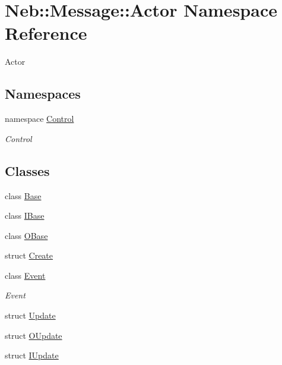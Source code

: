 \hypertarget{namespaceNeb_1_1Message_1_1Actor}{\section{\-Neb\-:\-:\-Message\-:\-:\-Actor \-Namespace \-Reference}
\label{namespaceNeb_1_1Message_1_1Actor}
}


\-Actor  


\subsection*{\-Namespaces}
\begin{DoxyCompactItemize}
\item 
namespace \hyperlink{namespaceNeb_1_1Message_1_1Actor_1_1Control}{\-Control}
\begin{DoxyCompactList}\small\item\em \-Control \end{DoxyCompactList}\end{DoxyCompactItemize}
\subsection*{\-Classes}
\begin{DoxyCompactItemize}
\item 
class \hyperlink{classNeb_1_1Message_1_1Actor_1_1Base}{\-Base}
\item 
class \hyperlink{classNeb_1_1Message_1_1Actor_1_1IBase}{\-I\-Base}
\item 
class \hyperlink{classNeb_1_1Message_1_1Actor_1_1OBase}{\-O\-Base}
\item 
struct \hyperlink{structNeb_1_1Message_1_1Actor_1_1Create}{\-Create}
\item 
class \hyperlink{classNeb_1_1Message_1_1Actor_1_1Event}{\-Event}
\begin{DoxyCompactList}\small\item\em \-Event \end{DoxyCompactList}\item 
struct \hyperlink{structNeb_1_1Message_1_1Actor_1_1Update}{\-Update}
\item 
struct \hyperlink{structNeb_1_1Message_1_1Actor_1_1OUpdate}{\-O\-Update}
\item 
struct \hyperlink{structNeb_1_1Message_1_1Actor_1_1IUpdate}{\-I\-Update}
\end{DoxyCompactItemize}
